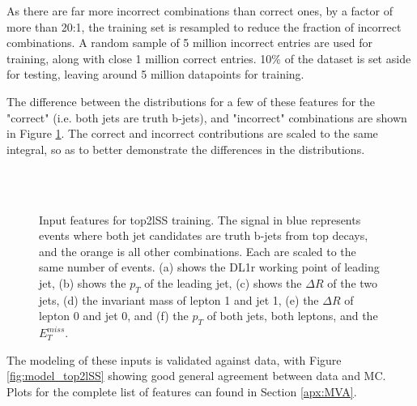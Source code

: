 As there are far more incorrect combinations than correct ones, by a factor of more than 20:1, the training set is resampled to reduce the fraction of incorrect combinations. A random sample of 5 million incorrect entries are used for training, along with close 1 million correct entries. 10\% of the dataset is set aside for testing, leaving around 5 million datapoints for training. 

The difference between the distributions for a few of these features for the "correct" (i.e. both jets are truth b-jets), and "incorrect" combinations are shown in Figure \ref{fig:features_top2lSS}. The correct and incorrect contributions are scaled to the same integral, so as to better demonstrate the differences in the distributions.

\begin{figure}[H]
    \centering
    \\
    \\
    \caption{Input features for top2lSS training. The signal in blue represents events where both jet candidates are truth b-jets from top decays, and the orange is all other combinations. Each are scaled to the same number of events. (a) shows the DL1r working point of leading jet, (b) shows the $p_T$ of the leading jet, (c) shows the $\Delta R$ of the two jets, (d) the invariant mass of lepton 1 and jet 1, (e) the $\Delta R$ of lepton 0 and jet 0, and (f) the $p_T$ of both jets, both leptons, and the $E_T^{miss}$.}
    \label{fig:features_top2lSS}                                                                                        
\end{figure}

The modeling of these inputs is validated against data, with Figure \ref{fig:model_top2lSS} showing good general agreement between data and MC. Plots for the complete list of features can found in Section \ref{apx:MVA}.

